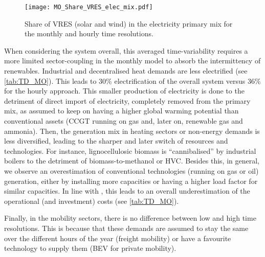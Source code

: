  \begin{figure}[!htbp]
\centering
\texttt{[image: MO\_Share\_VRES\_elec\_mix.pdf]}
\caption{Share of \gls{VRES} (\ie solar and wind) in the electricity primary mix for the monthly and hourly time resolutions.}
\label{fig:MO_Share_VRES_elec_mix}
\end{figure}

When considering the system overall, this averaged time-variability requires a more limited sector-coupling in the monthly model to absorb the intermittency of renewables. Industrial and decentralised heat demands are less electrified (see \autoref{tab:TD_MO}). This leads to 30\% electrification of the overall system versus 36\% for the hourly approach. This smaller production of electricity is done to the detriment of direct import of electricity, completely removed from the primary mix, as assumed to keep on having a higher global warming potential than conventional assets (\eg \gls{CCGT} running on gas and, later on, renewable gas and ammonia). Then, the generation mix in heating sectors or non-energy demands is less diversified, leading to the sharper and later switch of resources and technologies. For instance, lignocellulosic biomass is ``cannibalised'' by industrial boilers to the detriment of biomass-to-methanol or \gls{HVC}. Besides this, in general, we observe an overestimation of conventional technologies (\eg running on gas or oil) generation, either by installing more capacities or having a higher load factor for similar capacities. In line with \citet{Poncelet2016}, this leads to an overall underestimation of the operational (and investment) costs (see \autoref{tab:TD_MO}).

Finally, in the mobility sectors, there is no difference between low and high time resolutions. This is because that these demands are assumed to stay the same over the different hours of the year (\ie freight mobility) or have a favourite technology to supply them (\eg \gls{BEV} for private mobility).


